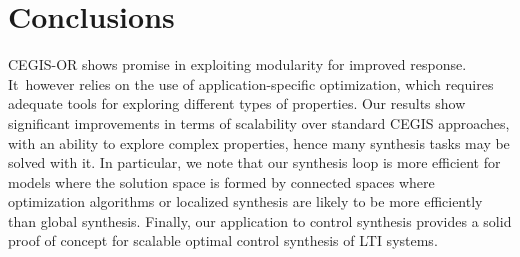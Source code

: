 \documentclass[a4paper,UKenglish]{lipics-v2018}
\begin{document}




\section{Conclusions}
\label{sec:conclusions}

CEGIS-OR shows promise in exploiting modularity for improved response. 
It~however relies on the use of application-specific optimization, which
requires adequate tools for exploring different types of properties.  Our
results show significant improvements in terms of scalability over standard
CEGIS approaches, with an ability to explore complex properties, hence many
synthesis tasks may be solved with it.  In particular, we note that our
synthesis loop is more efficient for models where the solution space is
formed by connected spaces where optimization algorithms or localized
synthesis are likely to be more efficiently than global synthesis.  Finally,
our application to control synthesis provides a solid proof of concept for
scalable optimal control synthesis of LTI systems.
\end{document}
